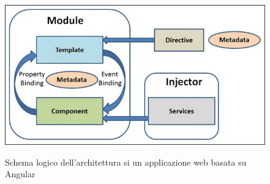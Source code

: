 \begin{figure}[!h] 
    \centering 
    \includegraphics[width=0.8\columnwidth]{immagini/AngularArchitecture.jpg} 
    \caption{Schema logico dell'architettura si un applicazione web basata su Angular}\cite{site:angular-architecture}
\end{figure}
